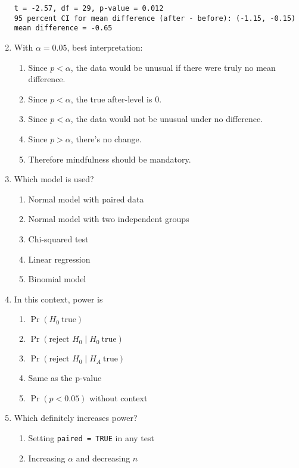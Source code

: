 \documentclass{article}
\begin{document}
\begin{enumerate}
\texttt{t = -2.57, df = 29, p-value = 0.012}\\
\texttt{95 percent CI for mean difference (after - before): (-1.15, -0.15)}\\
\texttt{mean difference = -0.65}
\item With $\alpha=0.05$, best interpretation:
    \begin{enumerate}[label=\Alph*.]
        \item Since $p < \alpha$, the data would be unusual if there were truly no mean difference.
        \item Since $p < \alpha$, the true after-level is 0.
        \item Since $p < \alpha$, the data would not be unusual under no difference.
        \item Since $p > \alpha$, there’s no change.
        \item Therefore mindfulness should be mandatory.
    \end{enumerate}
\item Which model is used?
    \begin{enumerate}[label=\Alph*.]
        \item Normal model with paired data
        \item Normal model with two independent groups
        \item Chi-squared test
        \item Linear regression
        \item Binomial model
    \end{enumerate}
\item In this context, power is
    \begin{enumerate}[label=\Alph*.]
        \item $\Pr(H_0\ \text{true})$
        \item $\Pr(\text{reject }H_0 \mid H_0\ \text{true})$
        \item $\Pr(\text{reject }H_0 \mid H_A\ \text{true})$
        \item Same as the p-value
        \item $\Pr(p<0.05)$ without context
    \end{enumerate}
\item Which definitely increases power?
    \begin{enumerate}[label=\Alph*.]
        \item Setting \texttt{paired = TRUE} in any test
        \item Increasing $\alpha$ and decreasing $n$

\end{enumerate}
\end{enumerate}
\end{document}
